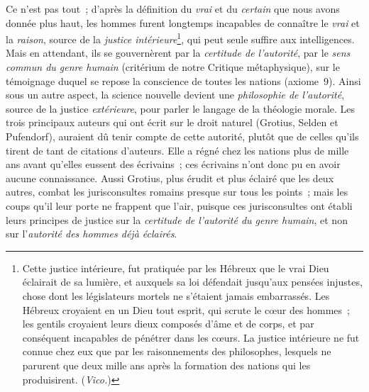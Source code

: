 \documentclass[french,twoside]{book} %
\begin{document}
Ce n’est pas tout ; d’après la définition du {\itshape vrai} et du {\itshape certain} que nous avons donnée plus haut, les hommes furent longtemps incapables de connaître le {\itshape vrai} et la {\itshape raison}, source de la {\itshape justice intérieure}\footnote{Cette justice intérieure, fut pratiquée par les Hébreux que le vrai Dieu éclairait de sa lumière, et auxquels sa loi défendait jusqu’aux pensées injustes, chose dont les législateurs mortels ne s’étaient jamais embarrassés. Les Hébreux croyaient en un Dieu tout esprit, qui scrute le cœur des hommes ; les gentils croyaient leurs dieux composés d’âme et de corps, et par conséquent incapables de pénétrer dans les cœurs. La justice intérieure ne fut connue chez eux que par les raisonnements des philosophes, lesquels ne parurent que deux mille ans après la formation des nations qui les produisirent. ({\itshape Vico.})},  qui peut seule suffire aux intelligences. Mais en attendant, ils se gouvernèrent par la {\itshape certitude de l’autorité}, par le {\itshape sens commun du genre humain} (critérium de notre Critique métaphysique), sur le témoignage duquel se repose la conscience de toutes les nations (axiome 9). Ainsi sous un autre aspect, la science nouvelle devient une {\itshape philosophie de l’autorité}, source de la justice {\itshape extérieure}, pour parler le langage de la théologie morale. Les trois principaux auteurs qui ont écrit sur le droit naturel (Grotius, Selden et Pufendorf), auraient dû tenir compte de cette autorité, plutôt que de celles qu’ils tirent de tant de citations d’auteurs. Elle a régné chez les nations plus de mille ans avant qu’elles eussent des écrivains ; ces écrivains n’ont donc pu en avoir aucune connaissance. Aussi Grotius, plus érudit et plus éclairé que les deux autres, combat les jurisconsultes romains presque sur tous les points ; mais les coups qu’il leur porte ne frappent que l’air, puisque ces jurisconsultes ont établi leurs principes de justice sur la {\itshape certitude de l’autorité du genre humain}, et non sur l’{\itshape autorité des hommes déjà éclairés}.\par
\par
\end{document}
